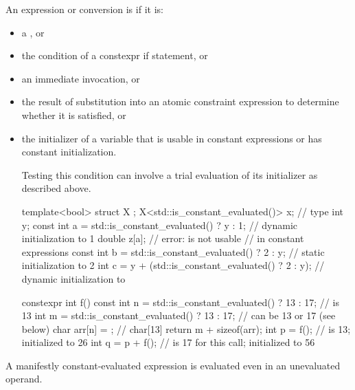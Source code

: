 \pnum
An expression or conversion is 
if it is:
\begin{itemize}
\item a , or
\item the condition of a constexpr if statement, or
\item an immediate invocation, or
\item the result of substitution into an atomic constraint expression
to determine whether it is satisfied, or
\item the initializer of a variable
that is usable in constant expressions or
has constant initialization.
\begin{footnote}
Testing this condition
can involve a trial evaluation of its initializer as described above.
\end{footnote}
\begin{example}
\begin{codeblock}
template<bool> struct X {};
X<std::is_constant_evaluated()> x;                      // type 
int y;
const int a = std::is_constant_evaluated() ? y : 1;     // dynamic initialization to 1
double z[a];                                            // error:  is not usable
                                                        // in constant expressions
const int b = std::is_constant_evaluated() ? 2 : y;     // static initialization to 2
int c = y + (std::is_constant_evaluated() ? 2 : y);     // dynamic initialization to 

constexpr int f() {
  const int n = std::is_constant_evaluated() ? 13 : 17; //  is 13
  int m = std::is_constant_evaluated() ? 13 : 17;       //  can be 13 or 17 (see below)
  char arr[n] = {}; // char[13]
  return m + sizeof(arr);
}
int p = f();                                            //  is 13; initialized to 26
int q = p + f();                                        //  is 17 for this call; initialized to 56
\end{codeblock}
\end{example}
\end{itemize}
\begin{note}
A manifestly constant-evaluated expression
is evaluated even in an unevaluated operand.
\end{note}

